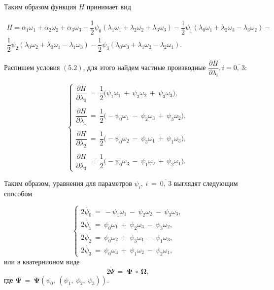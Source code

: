\documentclass[14pt]{extreport}
\begin{document}
Таким образом функция $H$ принимает вид

\begin{multline}
H = \alpha_1\omega_1 + \alpha_2\omega_2 + \alpha_3\omega_3 - 
\dfrac{1}{2}\psi_0(\lambda_1\omega_1 + \lambda_2\omega_2 + \lambda_3\omega_3) - 
\dfrac{1}{2}\psi_1(\lambda_0\omega_1 + \lambda_2\omega_3 - \lambda_3\omega_2) - \\
\dfrac{1}{2}\psi_2(\lambda_0\omega_2 + \lambda_3\omega_1 - \lambda_1\omega_3) - 
\dfrac{1}{2}\psi_3(\lambda_0\omega_3 + \lambda_1\omega_2 - \lambda_2\omega_1).
\end{multline}

Распишем условия $(5.2)$, для этого найдем частные производные $\dfrac{\partial H}{\partial \lambda_i}, i = \overline{0,\ 3}$:

\begin{equation}
\begin{cases}
 \dfrac{\partial H}{\partial \lambda_0}\ =\ \dfrac{1}{2}\big(\psi_1\omega_1\ +\ \psi_2\omega_2\ +\ \psi_3\omega_3 \big), \\ \\
 \dfrac{\partial H}{\partial \lambda_1}\ =\ \dfrac{1}{2}\big(- \psi_0\omega_1\ -\ \psi_2\omega_3\ +\ \psi_3\omega_2 \big), \\ \\
 \dfrac{\partial H}{\partial \lambda_2}\ =\ \dfrac{1}{2}\big(- \psi_0\omega_2\ -\ \psi_3\omega_1\ +\ \psi_1\omega_3 \big), \\ \\
 \dfrac{\partial H}{\partial \lambda_3}\ =\ \dfrac{1}{2}\big(- \psi_0\omega_3\ -\ \psi_1\omega_2\ +\ \psi_2\omega_1 \big). 
 \end{cases}
\end{equation}

Таким образом, уравнения для параметров $\psi_i,\ i\ =\ \overline{0,\ 3}$ выглядят следующим способом

\begin{equation}
\begin{cases}
 2\dot{\psi_0}\ =\ - \psi_1\omega_1\ -\ \psi_2\omega_2\ -\ \psi_3\omega_3, \\
 2\dot{\psi_1}\ =\ \psi_0\omega_1\ +\ \psi_2\omega_3\ -\ \psi_3\omega_2, \\
 2\dot{\psi_2}\ =\ \psi_0\omega_2\ +\ \psi_3\omega_1\ -\ \psi_1\omega_3, \\
 2\dot{\psi_3}\ =\ \psi_0\omega_3\ +\ \psi_1\omega_2\ -\ \psi_2\omega_1, 
 \end{cases}
\end{equation}
или в кватернионом виде
\begin{equation}
2\dot{\Psi}\ =\ \boldsymbol\Psi\ \circ\ \boldsymbol\Omega,
\end{equation}
где $\boldsymbol\Psi\ =\ \boldsymbol\Psi(\psi_0,\ (\psi_1,\ \psi_2,\ \psi_3))$.
\end{document}
